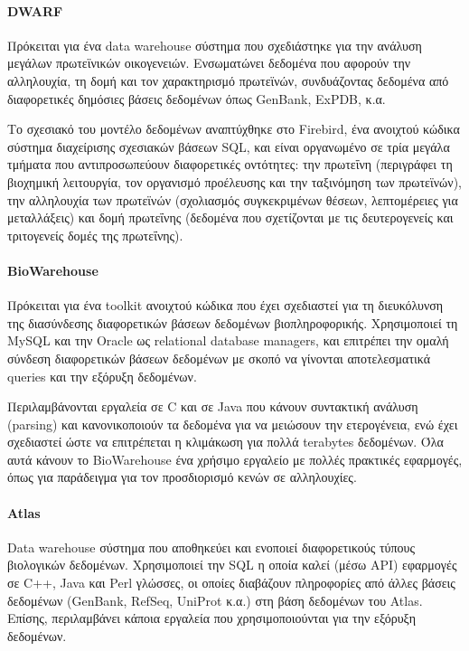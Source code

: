             \paragraph{DWARF}
                Πρόκειται για ένα data warehouse σύστημα που σχεδιάστηκε για την ανάλυση μεγάλων πρωτεϊνικών οικογενειών.
                Ενσωματώνει δεδομένα που αφορούν την αλληλουχία, τη δομή και τον χαρακτηρισμό πρωτεϊνών, συνδυάζοντας δεδομένα από διαφορετικές δημόσιες βάσεις δεδομένων όπως GenBank, ExPDB, κ.α.

                Το σχεσιακό του μοντέλο δεδομένων αναπτύχθηκε στο Firebird, ένα ανοιχτού κώδικα σύστημα διαχείρισης σχεσιακών βάσεων SQL, και είναι οργανωμένο σε τρία μεγάλα τμήματα που αντιπροσωπεύουν διαφορετικές οντότητες:
                    την πρωτεΐνη (περιγράφει τη βιοχημική λειτουργία, τον οργανισμό προέλευσης και την ταξινόμηση των πρωτεϊνών), την αλληλουχία των πρωτεϊνών (σχολιασμός συγκεκριμένων θέσεων,
                        λεπτομέρειες για μεταλλάξεις) και δομή πρωτεΐνης (δεδομένα που σχετίζονται με τις δευτερογενείς και τριτογενείς δομές της πρωτεΐνης). \cite{DWARF}

            \paragraph{BioWarehouse}
                Πρόκειται για ένα toolkit ανοιχτού κώδικα που έχει σχεδιαστεί για τη διευκόλυνση της διασύνδεσης διαφορετικών βάσεων δεδομένων βιοπληροφορικής.
                Χρησιμοποιεί τη MySQL και την Oracle ως relational database managers, και επιτρέπει την ομαλή σύνδεση διαφορετικών βάσεων δεδομένων με σκοπό να γίνονται αποτελεσματικά queries και την εξόρυξη δεδομένων. \cite{BioWarehouse}

                Περιλαμβάνονται εργαλεία σε C και σε Java που κάνουν συντακτική ανάλυση (parsing) και κανονικοποιούν τα δεδομένα για να μειώσουν την ετερογένεια, ενώ έχει σχεδιαστεί ώστε να επιτρέπεται η κλιμάκωση για πολλά terabytes δεδομένων.
                Όλα αυτά κάνουν το BioWarehouse ένα χρήσιμο εργαλείο με πολλές πρακτικές εφαρμογές, όπως για παράδειγμα για τον προσδιορισμό κενών σε αλληλουχίες.

            \paragraph{Atlas}
                Data warehouse σύστημα που αποθηκεύει και ενοποιεί διαφορετικούς τύπους βιολογικών δεδομένων.
                Χρησιμοποιεί την SQL η οποία καλεί (μέσω API) εφαρμογές σε C++, Java και Perl γλώσσες, οι οποίες διαβάζουν πληροφορίες από άλλες βάσεις δεδομένων (GenBank, RefSeq, UniProt κ.α.) στη βάση δεδομένων του Atlas.
                Επίσης, περιλαμβάνει κάποια εργαλεία που χρησιμοποιούνται για την εξόρυξη δεδομένων. \cite{Atlas}

